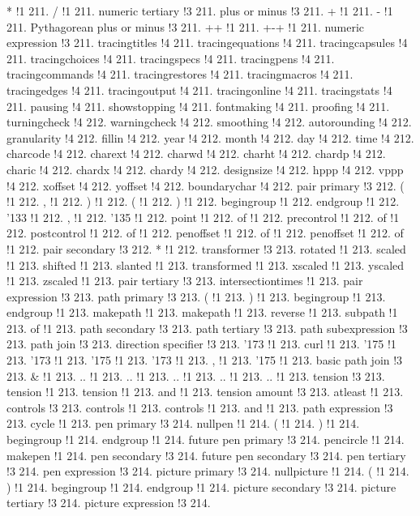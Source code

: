* !1 211.
/ !1 211.
numeric tertiary !3 211.
plus or minus !3 211.
+ !1 211.
- !1 211.
Pythagorean plus or minus !3 211.
++ !1 211.
+-+ !1 211.
numeric expression !3 211.
tracingtitles !4 211.
tracingequations !4 211.
tracingcapsules !4 211.
tracingchoices !4 211.
tracingspecs !4 211.
tracingpens !4 211.
tracingcommands !4 211.
tracingrestores !4 211.
tracingmacros !4 211.
tracingedges !4 211.
tracingoutput !4 211.
tracingonline !4 211.
tracingstats !4 211.
pausing !4 211.
showstopping !4 211.
fontmaking !4 211.
proofing !4 211.
turningcheck !4 212.
warningcheck !4 212.
smoothing !4 212.
autorounding !4 212.
granularity !4 212.
fillin !4 212.
year !4 212.
month !4 212.
day !4 212.
time !4 212.
charcode !4 212.
charext !4 212.
charwd !4 212.
charht !4 212.
chardp !4 212.
charic !4 212.
chardx !4 212.
chardy !4 212.
designsize !4 212.
hppp !4 212.
vppp !4 212.
xoffset !4 212.
yoffset !4 212.
boundarychar !4 212.
pair primary !3 212.
( !1 212.
, !1 212.
) !1 212.
( !1 212.
) !1 212.
begingroup !1 212.
endgroup !1 212.
\char '133 !1 212.
, !1 212.
\char '135 !1 212.
point !1 212.
of !1 212.
precontrol !1 212.
of !1 212.
postcontrol !1 212.
of !1 212.
penoffset !1 212.
of !1 212.
penoffset !1 212.
of !1 212.
pair secondary !3 212.
* !1 212.
transformer !3 213.
rotated !1 213.
scaled !1 213.
shifted !1 213.
slanted !1 213.
transformed !1 213.
xscaled !1 213.
yscaled !1 213.
zscaled !1 213.
pair tertiary !3 213.
intersectiontimes !1 213.
pair expression !3 213.
path primary !3 213.
( !1 213.
) !1 213.
begingroup !1 213.
endgroup !1 213.
makepath !1 213.
makepath !1 213.
reverse !1 213.
subpath !1 213.
of !1 213.
path secondary !3 213.
path tertiary !3 213.
path subexpression !3 213.
path join !3 213.
direction specifier !3 213.
\char '173 !1 213.
curl !1 213.
\char '175 !1 213.
\char '173 !1 213.
\char '175 !1 213.
\char '173 !1 213.
, !1 213.
\char '175 !1 213.
basic path join !3 213.
\& !1 213.
.. !1 213.
.. !1 213.
.. !1 213.
.. !1 213.
.. !1 213.
tension !3 213.
tension !1 213.
tension !1 213.
and !1 213.
tension amount !3 213.
atleast !1 213.
controls !3 213.
controls !1 213.
controls !1 213.
and !1 213.
path expression !3 213.
cycle !1 213.
pen primary !3 214.
nullpen !1 214.
( !1 214.
) !1 214.
begingroup !1 214.
endgroup !1 214.
future pen primary !3 214.
pencircle !1 214.
makepen !1 214.
pen secondary !3 214.
future pen secondary !3 214.
pen tertiary !3 214.
pen expression !3 214.
picture primary !3 214.
nullpicture !1 214.
( !1 214.
) !1 214.
begingroup !1 214.
endgroup !1 214.
picture secondary !3 214.
picture tertiary !3 214.
picture expression !3 214.
